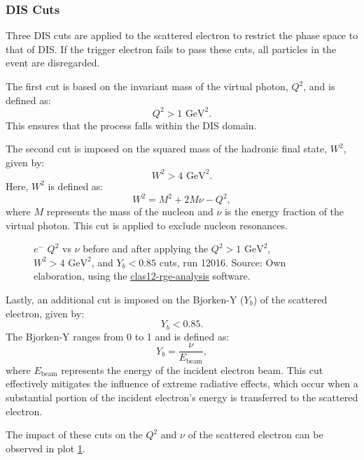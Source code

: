 \subsubsection{DIS Cuts}
\label{13.23::dis_cuts}
    Three DIS cuts are applied to the scattered electron to restrict the phase space to that of DIS.
    If the trigger electron fails to pass these cuts, all particles in the event are disregarded.

    The first cut is based on the invariant mass of the virtual photon, $Q^2$, and is defined as:
    \begin{equation*}
        Q^2 > 1 \text{ GeV}^2.
    \end{equation*}
    This ensures that the process falls within the DIS domain.

    The second cut is imposed on the squared mass of the hadronic final state, $W^2$, given by:
    \begin{equation*}
        W^2 > 4 \text{ GeV}^2.
    \end{equation*}
    Here, $W^2$ is defined as:
    \begin{equation*}
        W^2 = M^2 + 2M\nu - Q^2,
    \end{equation*}
    where $M$ represents the mass of the nucleon and $\nu$ is the energy fraction of the virtual photon.
    This cut is applied to exclude nucleon resonances.

    \begin{figure}[b!]
        \centering{}
        \caption[$Q^2$ vs $\nu$ comparison]{$e^-$ $Q^2$ vs $\nu$ before and after applying the $Q^2 > 1 \text{ GeV}^2$, $W^2 > 4 \text{ GeV}^2$, and $Y_b < 0.85$ cuts, run 12016.
        Source: Own elaboration, using the \hyperlink{github.com/bleaktwig/clas12-rge-analysis}{clas12-rge-analysis} software.}
        \label{fig::13.23::q2_vs_nu}
    \end{figure}

    Lastly, an additional cut is imposed on the Bjorken-Y ($Y_b$) of the scattered electron, given by:
    \begin{equation*}
        Y_b < 0.85.
    \end{equation*}
    The Bjorken-Y ranges from 0 to 1 and is defined as:
    \begin{equation*}
        Y_b = \frac{\nu}{E_\text{beam}},
    \end{equation*}
    where $E_\text{beam}$ represents the energy of the incident electron beam.
    This cut effectively mitigates the influence of extreme radiative effects, which occur when a substantial portion of the incident electron's energy is transferred to the scattered electron.

    The impact of these cuts on the $Q^2$ and $\nu$ of the scattered electron can be observed in plot \ref{fig::13.23::q2_vs_nu}.
